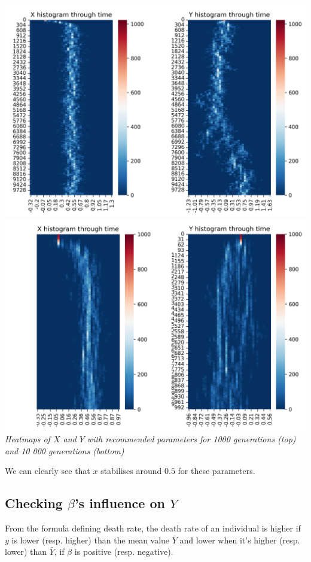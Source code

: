 \documentclass{article}
\begin{document}
\begin{center}
\includegraphics[scale=0.5]{10000} \\
\includegraphics[scale=0.5]{1000} \\
\textit{Heatmaps of $X$ and $Y$ with recommended parameters for 1000 generations (top) and 10 000 generations (bottom)}
\end{center}

We can clearly see that $x$ stabilises around $0.5$ for these parameters.

\subsection{Checking $\beta$'s influence on $Y$}

From the formula defining death rate, the death rate of an individual is higher if $y$ is lower (resp. higher) than the mean value $\bar{Y}$ and lower when it's higher (resp. lower) than $\bar{Y}$, if $\beta$ is positive (resp. negative). \\
\vspace{5mm}
\end{document}
